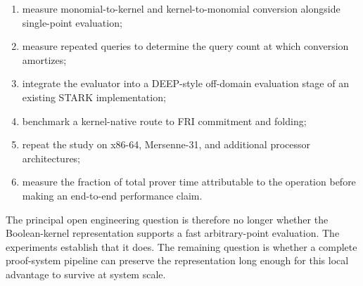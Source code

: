 \begin{enumerate}
    \item measure monomial-to-kernel and kernel-to-monomial conversion
    alongside single-point evaluation;
    \item measure repeated queries to determine the query count at which
    conversion amortizes;
    \item integrate the evaluator into a DEEP-style off-domain evaluation
    stage of an existing STARK implementation;
    \item benchmark a kernel-native route to FRI commitment and folding;
    \item repeat the study on x86-64, Mersenne-31, and additional processor
    architectures;
    \item measure the fraction of total prover time attributable to the
    operation before making an end-to-end performance claim.
\end{enumerate}

The principal open engineering question is therefore no longer whether the
Boolean-kernel representation supports a fast arbitrary-point evaluation.
The experiments establish that it does.  The remaining question is whether
a complete proof-system pipeline can preserve the representation long enough
for this local advantage to survive at system scale.
